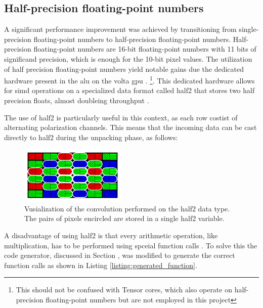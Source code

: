 \subsection{Half-precision floating-point numbers}
\label{sec:half2}
A significant performance improvement was achieved by transitioning from single-precision floating-point numbers to half-precision floating-point numbers.
Half-precision floating-point numbers are 16-bit floating-point numbers with 11 bits of significand precision, which is enough for the 10-bit pixel values.
The utilization of half precision floating-point numbers yield notable gains due the dedicated hardware present in the \gls{alu} on the \gls{volta} \gls{gpu} \cite{CUDA2023}.
\footnote{This should not be confused with Tensor cores, which also operate on half-precision floating-point numbers but are not employed in this project}.
This dedicated hardware allows for \gls{simd} operations on a specialized data format called \gls{half2} that stores two half precision floats, almost doubleing throughput \cite{nvidiaHalf2ArithmeticFunctions2023}\cite{hoExploitingHalfPrecision2017}.

The use of \gls{half2} is particularly useful in this context, as each row costist of alternating polarization channels.
This means that the incoming data can be cast directly to \gls{half2} during the unpacking phase, as follows:



\begin{figure}[H]
    \centering
    \includegraphics[width=0.45\textwidth]{figures/polarized_image/half2_conv.pdf}
    \caption{Vusialization of the convolution performed on the \gls{half2} data type. The pairs of pixels encircled are stored in a single \gls{half2} variable.}
    \label{fig:half2_conv}
\end{figure}

A disadvantage of using \gls{half2} is that every arithmetic operation, like multiplication, has to be performed using spceial function calls \cite{nvidiaHalf2ArithmeticFunctions2023}.
To solve this the code generator, discussed in Section \todo, was modified to generate the correct function calls as shown in Listing \ref{listing:generated_function}.

